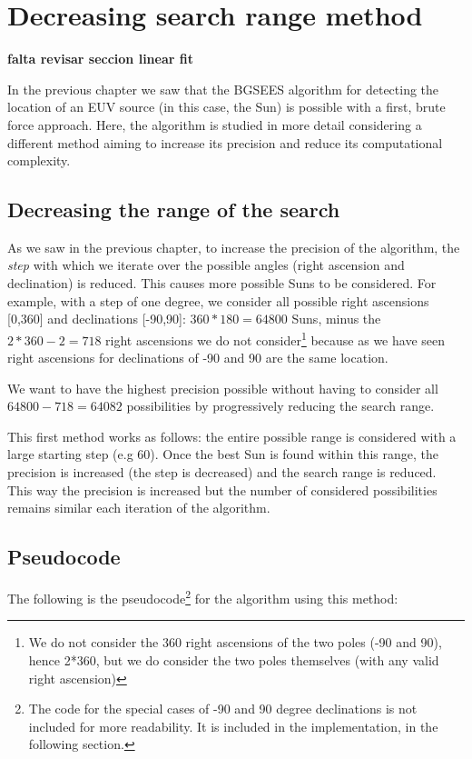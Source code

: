\chapter{Decreasing search range method}\label{decRangeChapter}

\textbf{falta revisar seccion linear fit}

In the previous chapter we saw that the BGSEES algorithm for detecting the location of an EUV source (in this case, the Sun) is possible with a first, brute force approach. Here, the algorithm is studied in more detail considering a different method aiming to increase its precision and reduce its computational complexity.

\section{Decreasing the range of the search}

As we saw in the previous chapter, to increase the precision of the algorithm, the \textit{step} with which we iterate over the possible angles (right ascension and declination) is reduced. This causes more possible Suns to be considered. For example, with a step of one degree, we consider all possible right ascensions [0,360] and declinations [-90,90]: $360*180 = 64800$ Suns, minus the $2*360 - 2 = 718$ right ascensions we do not consider\footnote{We do not consider the 360 right ascensions of the two poles (-90 and 90), hence 2*360, but we do consider the two poles themselves (with any valid right ascension)} because as we have seen right ascensions for declinations of -90 and 90 are the same location.

We want to have the highest precision possible without having to consider all $64800 - 718 = 64082$ possibilities by progressively reducing the search range.

This first method works as follows: the entire possible range is considered with a large starting step (e.g 60). Once the best Sun is found within this range, the precision is increased (the step is decreased) and the search range is reduced. This way the precision is increased but the number of considered possibilities remains similar each iteration of the algorithm.

\section{Pseudocode}

The following is the pseudocode\footnote{The code for the special cases of -90 and 90 degree declinations is not included for more readability. It is included in the implementation, in the following section.} for the algorithm using this method:

